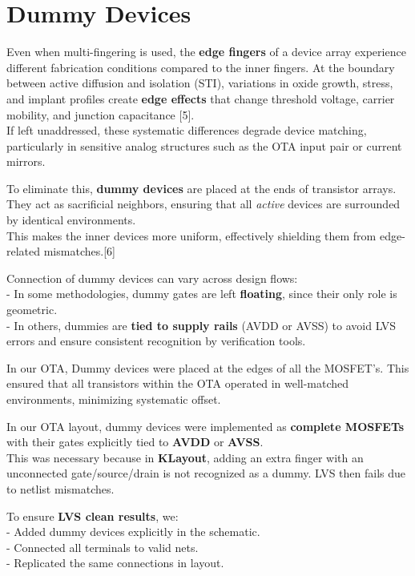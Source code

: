 \documentclass[
  11pt,
  a4paper,
  oneside]{scrbook}
\begin{document}
\section{Dummy Devices}\label{dummy-devices}

Even when multi-fingering is used, the \textbf{edge fingers} of a device
array experience different fabrication conditions compared to the inner
fingers. At the boundary between active diffusion and isolation (STI),
variations in oxide growth, stress, and implant profiles create
\textbf{edge effects} that change threshold voltage, carrier mobility,
and junction capacitance {[}5{]}.\\
If left unaddressed, these systematic differences degrade device
matching, particularly in sensitive analog structures such as the OTA
input pair or current mirrors.

To eliminate this, \textbf{dummy devices} are placed at the ends of
transistor arrays. They act as sacrificial neighbors, ensuring that all
\emph{active} devices are surrounded by identical environments.\\
This makes the inner devices more uniform, effectively shielding them
from edge-related mismatches.{[}6{]}

Connection of dummy devices can vary across design flows:\\
- In some methodologies, dummy gates are left \textbf{floating}, since
their only role is geometric.\\
- In others, dummies are \textbf{tied to supply rails} (AVDD or AVSS) to
avoid LVS errors and ensure consistent recognition by verification
tools.

In our OTA, Dummy devices were placed at the edges of all the MOSFET's.
This ensured that all transistors within the OTA operated in
well-matched environments, minimizing systematic offset.

\begin{tcolorbox}[enhanced jigsaw, opacityback=0, breakable, colback=white, left=2mm, toprule=.15mm, arc=.35mm, coltitle=black, leftrule=.75mm, colbacktitle=quarto-callout-important-color!10!white, rightrule=.15mm, colframe=quarto-callout-important-color-frame, titlerule=0mm, title=\textcolor{quarto-callout-important-color}{\faExclamation}\hspace{0.5em}{Important Implementation Note}, toptitle=1mm, bottomtitle=1mm, bottomrule=.15mm, opacitybacktitle=0.6]

In our OTA layout, dummy devices were implemented as \textbf{complete
MOSFETs} with their gates explicitly tied to \textbf{AVDD} or
\textbf{AVSS}.\\
This was necessary because in \textbf{KLayout}, adding an extra finger
with an unconnected gate/source/drain is not recognized as a dummy. LVS
then fails due to netlist mismatches.

To ensure \textbf{LVS clean results}, we:\\
- Added dummy devices explicitly in the schematic.\\
- Connected all terminals to valid nets.\\
- Replicated the same connections in layout.

\end{tcolorbox}
\end{document}

